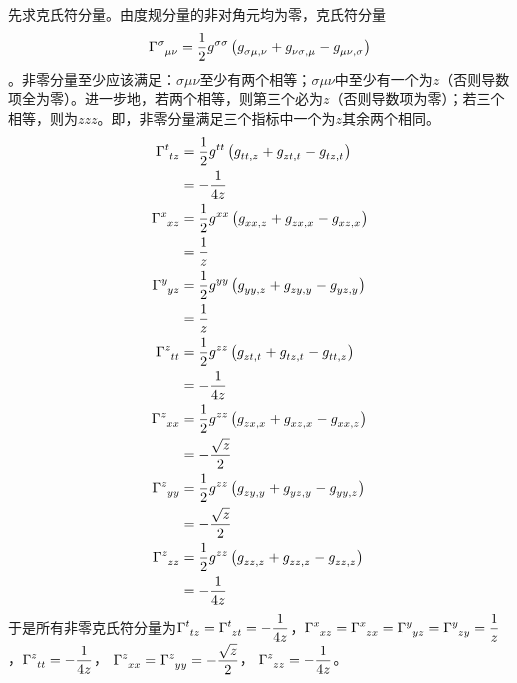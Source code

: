 \begin{xiti}
	\begin{jie}
		先求克氏符分量。由度规分量的非对角元均为零，克氏符分量\[\ChristoffelSymbol{\sigma}{\mu}{\nu}=\christoffelSymbol{\sigma}{\mu}{\nu}{\sigma}\]。非零分量至少应该满足：$\sigma\mu\nu$至少有两个相等；$\sigma\mu\nu$中至少有一个为$z$（否则导数项全为零）。进一步地，若两个相等，则第三个必为$z$（否则导数项为零）；若三个相等，则为$zzz$。即，非零分量满足三个指标中一个为$z$其余两个相同。
		\begin{align*}
		\ChristoffelSymbol{t}{t}{z}&= \christoffelSymbol{t}{t}{z}{t}\\
		&=-\frac{1}{4z}\\
		\ChristoffelSymbol{x}{x}{z}&= \christoffelSymbol{x}{x}{z}{x}\\
		&=\frac{1}{z}\\
		\ChristoffelSymbol{y}{y}{z}&= \christoffelSymbol{y}{y}{z}{y}\\
		&=\frac{1}{z}\\
		\ChristoffelSymbol{z}{t}{t}&= \christoffelSymbol{z}{t}{t}{z}\\
		&=-\frac{1}{4z}\\
		\ChristoffelSymbol{z}{x}{x}&= \christoffelSymbol{z}{x}{x}{z}\\
		&=-\frac{\sqrt{z}}{2}\\
		\ChristoffelSymbol{z}{y}{y}&= \christoffelSymbol{z}{y}{y}{z}\\
		&=-\frac{\sqrt{z}}{2}\\
		\ChristoffelSymbol{z}{z}{z}&= \christoffelSymbol{z}{z}{z}{z}\\
		&=-\frac{1}{4z}
		\end{align*}
		于是所有非零克氏符分量为$\displaystyle \ChristoffelSymbol{t}{t}{z}= \ChristoffelSymbol{t}{z}{t}= -\frac{1}{4z}$，$\displaystyle \ChristoffelSymbol{x}{x}{z}= \ChristoffelSymbol{x}{z}{x} = \ChristoffelSymbol{y}{y}{z}= \ChristoffelSymbol{y}{z}{y}= \frac{1}{z} $，$\displaystyle \ChristoffelSymbol{z}{t}{t}= -\frac{1}{4z}$， $\displaystyle \ChristoffelSymbol{z}{x}{x}= \ChristoffelSymbol{z}{y}{y}= -\frac{\sqrt{z}}{2} $， $\displaystyle \ChristoffelSymbol{z}{z}{z}= -\frac{1}{4z} $。
		

\end{jie}
\end{xiti}
